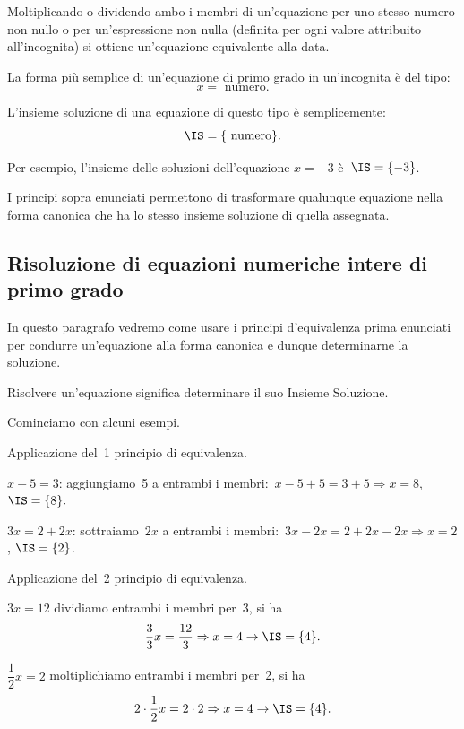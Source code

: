 \begin{principio}
 Moltiplicando o dividendo ambo i membri di
un'equazione per uno stesso numero non nullo o per
un'espressione non nulla (definita per ogni valore
attribuito all'incognita) si ottiene
un'equazione equivalente alla data.
\end{principio}


La forma più semplice di un'equazione di primo grado in
un'incognita è del tipo:
\[x = \text{ numero}.\]

L'insieme soluzione di una
equazione di questo tipo è semplicemente:
\[\IS=\{\text{ numero} \}.\]

Per esempio, l'insieme delle soluzioni dell'equazione
$x = -3$ è~$\IS =\{-3\}$.

I principi sopra enunciati permettono di trasformare qualunque equazione
nella forma canonica che ha lo stesso insieme soluzione di quella
assegnata.

\subsection{Risoluzione di equazioni numeriche intere di primo grado}
In questo paragrafo vedremo come usare i principi
d'equivalenza prima enunciati per condurre
un'equazione alla forma canonica e dunque determinarne
la soluzione.

\begin{definizione}
Risolvere un'equazione significa
determinare il suo Insieme Soluzione.
\end{definizione}

Cominciamo con alcuni esempi.

\begin{exrig}
 \begin{esempio}
Applicazione del~1{\textdegree} principio di equivalenza.

\begin{enumeratea}
\item $x-5=3$:
aggiungiamo~5 a entrambi i membri:~$x-5+5=3+5\Rightarrow x=8$, $\IS =\{8\}.$
\item $3x=2+2x$: sottraiamo~$2x$ a entrambi i membri:~$3x-2x=2+2x-2x\Rightarrow 
x=2$,
$\IS =\{2\}$.
\end{enumeratea}
 \end{esempio}
\end{exrig}

\begin{exrig}
 \begin{esempio}
 Applicazione del~2{\textdegree} principio di equivalenza.

 \begin{enumeratea}
\item $3x=12$ dividiamo entrambi i membri per~3, si ha
\[\dfrac{3}{3}x=\dfrac{12}{3}\Rightarrow x=4\to\IS =\{4\}.\]
\item $\dfrac{1}{2}x=2$ moltiplichiamo entrambi i membri per~2, si ha
\[2\cdot {\dfrac{1}{2}}x=2\cdot 2\Rightarrow x=4\to\IS =\{4\}.\]
\end{enumeratea}
\end{esempio}
\end{exrig}

